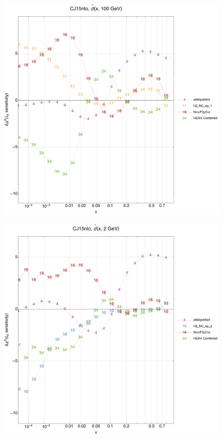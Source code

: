 \documentclass[10pt,aps,prd,floatfix,titlepage]{revtex4}
\begin{document}
\clearpage
\begin{figure}
\includegraphics[width=\textwidth,height=0.44\textheight,keepaspectratio]{1/ifl-1_CJ15nlo_L2_q100_Sf_1.pdf}
\caption{}
\end{figure}
\begin{figure}
\includegraphics[width=\textwidth,height=0.44\textheight,keepaspectratio]{1/ifl-1_CJ15nlo_L2_q2_Sf_1.pdf}
\caption{}
\end{figure}
\end{document}
